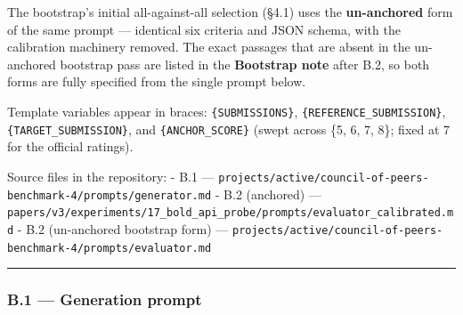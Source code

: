 The bootstrap's initial all-against-all selection (§4.1) uses the \textbf{un-anchored} form of the same prompt --- identical six criteria and JSON schema, with the calibration machinery removed. The exact passages that are absent in the un-anchored bootstrap pass are listed in the \textbf{Bootstrap note} after B.2, so both forms are fully specified from the single prompt below.

Template variables appear in braces: \texttt{\{SUBMISSIONS\}}, \texttt{\{REFERENCE\_SUBMISSION\}}, \texttt{\{TARGET\_SUBMISSION\}}, and \texttt{\{ANCHOR\_SCORE\}} (swept across \{5, 6, 7, 8\}; fixed at 7 for the official ratings).

Source files in the repository: - B.1 --- \texttt{projects/active/council-of-peers-benchmark-4/prompts/generator.md} - B.2 (anchored) --- \texttt{papers/v3/experiments/17\_bold\_api\_probe/prompts/evaluator\_calibrated.md} - B.2 (un-anchored bootstrap form) --- \texttt{projects/active/council-of-peers-benchmark-4/prompts/evaluator.md}

\begin{center}\rule{0.5\linewidth}{0.5pt}\end{center}

\subsubsection{B.1 --- Generation prompt}\label{b.1-generation-prompt}

